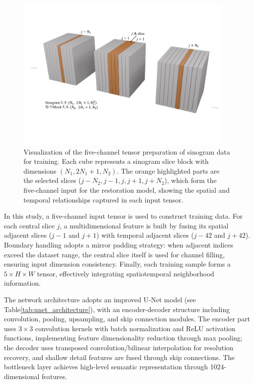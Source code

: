 \documentclass[
reprint,
superscriptaddress,
nofootinbib,
amsmath,amssymb,
aps,
prd,
]{revtex4-2}
\begin{document}
\begin{figure}[htbp]
\centering
\vspace{-.3cm}
\includegraphics[width=0.96\textwidth]{Images/fdafads.pdf}
\vspace{-.3cm}
\caption{Visualization of the five-channel tensor preparation of sinogram data for training. Each cube represents a sinogram slice block with dimensions $(N_1, 2N_1+1, N_2)$. The orange highlighted parts are the selected slices ($j-N_2, j-1, j, j+1, j+N_2$), which form the five-channel input for the restoration model, showing the spatial and temporal relationships captured in each input tensor.}
\label{fig:sinogram_structure}
\end{figure}


In this study, a five-channel input tensor is used to construct training data. For each central slice $j$, a multidimensional feature is built by fusing its spatial adjacent slices ($j-1$ and $j+1$) with temporal adjacent slices ($j-42$ and $j+42$). Boundary handling adopts a mirror padding strategy: when adjacent indices exceed the dataset range, the central slice itself is used for channel filling, ensuring input dimension consistency. Finally, each training sample forms a $5\times H\times W$ tensor, effectively integrating spatiotemporal neighborhood information.\par

The network architecture adopts an improved U-Net model (see Table\ref{tab:unet_architecture}), with an encoder-decoder structure including convolution, pooling, upsampling, and skip connection modules. The encoder part uses $3\times3$ convolution kernels with batch normalization and ReLU activation functions, implementing feature dimensionality reduction through max pooling; the decoder uses transposed convolution/bilinear interpolation for resolution recovery, and shallow detail features are fused through skip connections. The bottleneck layer achieves high-level semantic representation through 1024-dimensional features.
\end{document}
